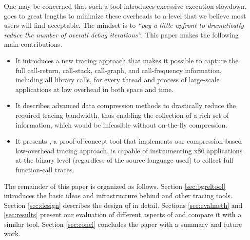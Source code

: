 One may be concerned that such a tool introduces excessive execution slowdown.
%
\parlot goes to great lengths to minimize these overheads to a level that we believe most users will find acceptable. The mindset is to \textit{``pay a little upfront to dramatically reduce the number of overall debug iterations''}. 
%
This paper makes the following main contributions.
%
\begin{itemize}
\item It introduces a new tracing approach that makes it possible to capture the full call-return, call-stack, call-graph, and call-frequency information, including all library calls, for every thread and process of large-scale applications at low overhead in both space and time.
\item It describes advanced data compression methods to drastically reduce the required tracing bandwidth, thus enabling the collection of a rich set of information, which would be infeasible without on-the-fly compression.
\item It presents \parlot, a proof-of-concept tool that implements our compression-based low-overhead tracing approach. \parlot is capable of instrumenting x86 applications at the binary level (regardless of the source language used) to collect full function-call traces.
\end{itemize}
The remainder of this paper is organized as follows. Section \ref{sec:bgreltool} introduces the basic ideas and infrastructure behind \parlot and other tracing tools. Section \ref{sec:design} describes the design of \parlot in detail. Sections \ref{sec:evalmeth} and \ref{sec:results} present our evaluation of different aspects of \parlot and compare it with a similar tool. Section \ref{sec:concl}
concludes the paper with a summary and future work.


